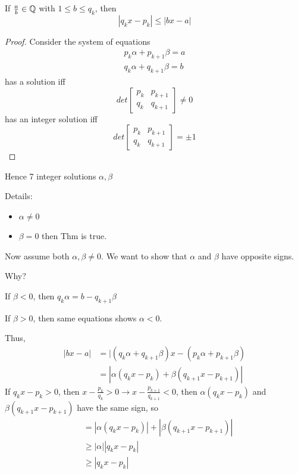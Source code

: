    \begin{lemma}
        If $\frac{a}{b} \in\mathbb{Q}$ with $1\le b\le q_k$, then 
        \[
            |q_kx-p_k| \le |bx-a|
        \]
        \begin{proof}
            Consider the system of equations
            \begin{align*}
                p_k\alpha + p_{k+1}\beta = a \\
                q_k\alpha + q_{k+1}\beta = b
            \end{align*}
            has a solution iff
            \[
                det\begin{bmatrix}
                    p_k & p_{k+1} \\
                    q_k & q_{k+1}
                \end{bmatrix} \ne 0
            \]
            has an integer solution iff 
            \[
                det\begin{bmatrix}
                    p_k & p_{k+1} \\
                    q_k & q_{k+1}
                \end{bmatrix} = \pm 1
            \]
        \end{proof}
    \end{lemma}

    Hence 7 integer solutions $\alpha, \beta$

    Details: 
    \begin{itemize}
        \item $\alpha \ne 0$
        \item $\beta = 0$ then Thm is true.
    \end{itemize}
    Now assume both $\alpha,\beta \ne 0$.
    We want to show that $\alpha$ and $\beta$ have opposite signs.

    Why? 
    
    If $\beta < 0$, then $q_k\alpha = b - q_{k+1}\beta$

    If $\beta > 0$, then same equations shows $\alpha < 0$.

    Thus, 
    \begin{align*}
        |bx-a| &= |(q_k\alpha + q_{k+1}\beta)x - (p_k\alpha + p_{k+1}\beta) \\
        &= |\alpha(q_kx - p_k) + \beta(q_{k+1}x-p_{k+1})| 
    \end{align*}
    If $q_kx-p_k > 0$, then $x-\frac{p_k}{q_k} > 0 \rightarrow x-\frac{p_{k+1}}{q_{k+1}} < 0$, 
    then $\alpha(q_kx - p_k)$ and $\beta(q_{k+1}x-p_{k+1})$ have the same sign, so
    \begin{align*}
        &= |\alpha(q_kx - p_k)| + |\beta(q_{k+1}x-p_{k+1})| \\
        &\ge |\alpha||q_kx-p_k| \\
        &\ge |q_kx-p_k|
    \end{align*}

